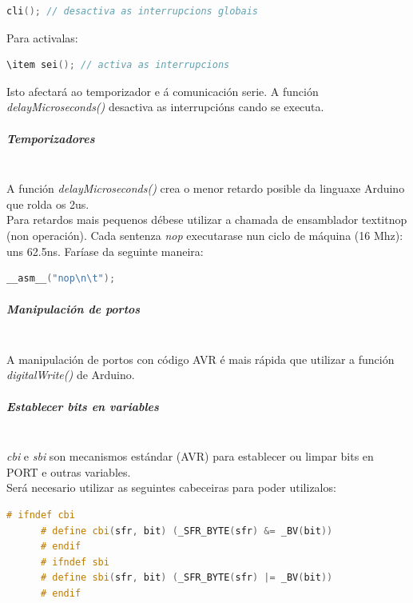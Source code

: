     \begin{lstlisting}[language=C++,frame=single]
     cli(); // desactiva as interrupcions globais
    \end{lstlisting}

    Para activalas: \\

    \begin{lstlisting}[language=C++,frame=single]
     \item sei(); // activa as interrupcions
    \end{lstlisting}

    Isto afectará ao temporizador e á comunicación serie. A función
    \textit{delayMicroseconds()} desactiva as interrupcións cando se executa.

    \subparagraph{Temporizadores}\mbox{}\\

    A función \textit{delayMicroseconds()} crea o menor retardo posible da
    linguaxe Arduino que rolda os 2us. \\

    Para retardos mais pequenos débese utilizar a chamada de ensamblador textit{nop}
    (non operación). Cada sentenza \textit{nop} executarase nun ciclo de
    máquina (16 Mhz): uns 62.5ns. Faríase da seguinte maneira: \\

    \begin{lstlisting}[language=C++,frame=single]
     __asm__("nop\n\t");
    \end{lstlisting}

    \subparagraph{Manipulación de portos}\mbox{}\\

    A manipulación de portos con código AVR é mais rápida que utilizar a
    función \textit{digitalWrite()} de Arduino.

    \subparagraph{Establecer bits en variables}\mbox{}\\

    \textit{cbi} e \textit{sbi} son mecanismos estándar (AVR) para establecer
    ou limpar bits en PORT e outras variables. \\

    Será necesario utilizar as seguintes cabeceiras para poder utilizalos: \\

     \begin{lstlisting}[language=C++,frame=single]
      # ifndef cbi
      # define cbi(sfr, bit) (_SFR_BYTE(sfr) &= _BV(bit))
      # endif
      # ifndef sbi
      # define sbi(sfr, bit) (_SFR_BYTE(sfr) |= _BV(bit))
      # endif
     \end{lstlisting}

